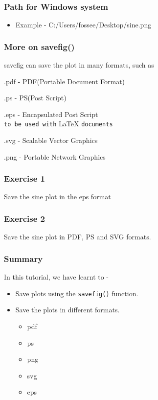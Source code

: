 \documentclass[17pt]{beamer}
\begin{document}
\begin{frame}[fragile]
\frametitle{Path for Windows system}
\label{sec-6}
\begin{itemize}
\item Example - {C:/Users/fossee/Desktop/sine.png}
\end{itemize} %
\end{frame}
\begin{frame}
\frametitle{More on savefig()}
\label{sec-7}
savefig can save the plot in many formats, such as \pause
\begin{itemize}

\label{sec-7_2}%
\begin{footnotesize}
\item .pdf - PDF(Portable Document Format)\pause\\
\label{sec-7_2_1}%
\item .ps - PS(Post Script)\pause\\
\label{sec-7_2_2}%
\item .eps - Encapsulated Post Script\pause\\
\label{sec-7_2_3}%
\verb~to be used with~ \LaTeX{} \verb~documents~\pause
\item .svg - Scalable Vector Graphics\pause\\
\label{sec-7_2_4}%
\item .png - Portable Network Graphics
\end{footnotesize}
\end{itemize} %
\end{frame}
\begin{frame}
\frametitle{Exercise 1}
\label{sec-8}
Save the sine plot in the eps format
\end{frame}
\begin{frame}
\frametitle{Exercise 2}
\label{sec-9}
Save the sine plot in PDF, PS and SVG formats.
\end{frame}
\begin{frame}
\frametitle{Summary}
\label{sec-10}
In this tutorial, we have learnt to -
\begin{itemize}
\item Save plots using the \texttt{savefig()} function.
\item Save the plots in different formats.
\begin{itemize}
\item pdf
\item ps
\item png
\item svg
\item eps
\end{itemize}
\end{itemize}
\end{frame}
\end{document}
